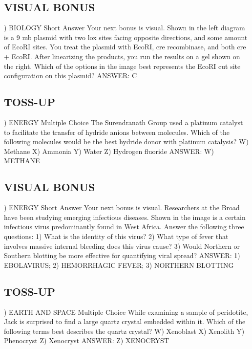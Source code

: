 \documentclass{article}
\begin{document}
\subsection*{VISUAL BONUS}
) BIOLOGY Short Answer Your next bonus is visual. Shown in the left diagram is a 9 mb plasmid with two lox sites facing opposite directions, and some amount of EcoRI sites. You treat the plasmid with EcoRI, cre recombinase, and both cre + EcoRI. After linearizing the products, you run the results on a gel shown on the right. Which of the options in the image best represents the EcoRI cut site configuration on this plasmid?
\noindent ANSWER: C

\subsection*{TOSS-UP}
) ENERGY Multiple Choice The Surendranath Group used a platinum catalyst to facilitate the transfer of hydride anions between molecules. Which of the following molecules would be the best hydride donor with platinum catalysis?
\noindent W) Methane
\noindent X) Ammonia
\noindent Y) Water
\noindent Z) Hydrogen fluoride
\noindent ANSWER: W) METHANE

\subsection*{VISUAL BONUS}
) ENERGY Short Answer Your next bonus is visual. Researchers at the Broad have been studying emerging infectious diseases. Shown in the image is a certain infectious virus predominantly found in West Africa. Answer the following three questions: 1) What is the identity of this virus? 2) What type of fever that involves massive internal bleeding does this virus cause? 3) Would Northern or Southern blotting be more effective for quantifying viral spread?
\noindent ANSWER: 1) EBOLAVIRUS; 2) HEMORRHAGIC FEVER; 3) NORTHERN BLOTTING

\subsection*{TOSS-UP}
) EARTH AND SPACE Multiple Choice While examining a sample of peridotite, Jack is surprised to find a large quartz crystal embedded within it. Which of the following terms best describes the quartz crystal?
\noindent W) Xenoblast
\noindent X) Xenolith
\noindent Y) Phenocryst
\noindent Z) Xenocryst
\noindent ANSWER: Z) XENOCRYST
\end{document}
